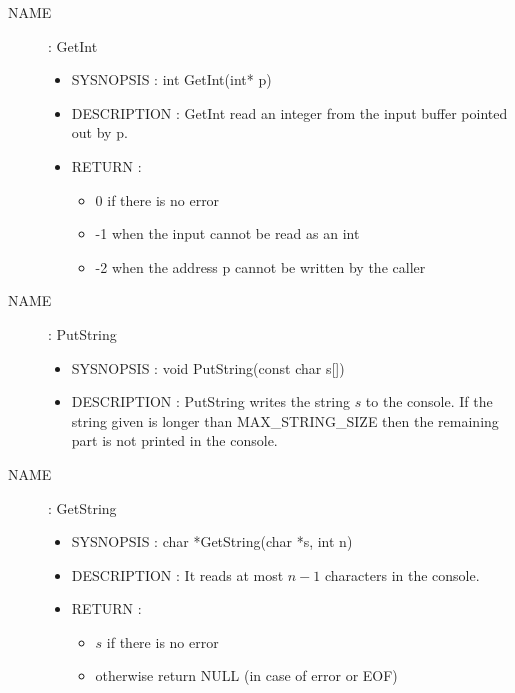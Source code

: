\documentclass[a4paper,10pt]{article}
\begin{document}
\begin{description}
    \item [NAME] : GetInt
        \begin{itemize}
            \item SYSNOPSIS : int GetInt(int* p)
            \item DESCRIPTION :
                GetInt read an integer from the input buffer pointed out by p.
            \item RETURN :
                \begin{itemize}
                    \item 0 if there is no error
                    \item -1 when the input cannot be read as an int
                    \item -2 when the address p cannot be written by the caller
                \end{itemize}
        \end{itemize}

    \item [NAME] : PutString
        \begin{itemize}
            \item SYSNOPSIS : void PutString(const char s[])
            \item DESCRIPTION :
                PutString writes the string $s$ to the console. If the string given is longer than
                MAX\_STRING\_SIZE then the remaining part is not printed in the console.
        \end{itemize}

    \item [NAME] : GetString
        \begin{itemize}
            \item SYSNOPSIS : char *GetString(char *s, int n)
            \item DESCRIPTION :
                It reads at most $n-1$ characters in the console.
            \item RETURN :
                \begin{itemize}
                    \item $s$ if there is no error
                    \item otherwise return NULL (in case of error or EOF)
                \end{itemize}
        \end{itemize}


\end{description}
\end{document}

